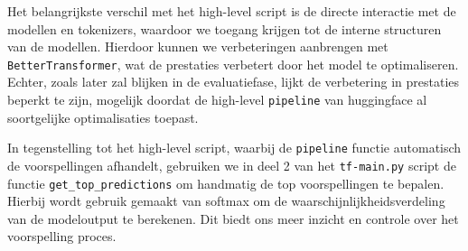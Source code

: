 Het belangrijkste verschil met het high-level script is de directe interactie met de modellen en tokenizers, waardoor we toegang krijgen tot de interne structuren van de modellen. Hierdoor kunnen we verbeteringen aanbrengen met \texttt{BetterTransformer}, wat de prestaties verbetert door het model te optimaliseren. Echter, zoals later zal blijken in de evaluatiefase, lijkt de verbetering in prestaties beperkt te zijn, mogelijk doordat de high-level \texttt{pipeline}  van \gls{huggingface} al soortgelijke optimalisaties toepast.

In tegenstelling tot het high-level script, waarbij de \texttt{pipeline} functie automatisch de voorspellingen afhandelt, gebruiken we in deel 2 van het \texttt{tf-main.py} script de functie \texttt{get\_top\_predictions} om handmatig de top voorspellingen te bepalen. Hierbij wordt gebruik gemaakt van \gls{softmax} om de waarschijnlijkheidsverdeling van de modeloutput te berekenen. Dit biedt ons meer inzicht en controle over het voorspelling proces.

